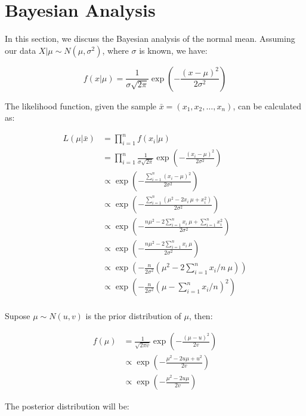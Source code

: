 \section{Bayesian Analysis}

In this section, we discuss the Bayesian analysis of the normal mean.
Assuming our data $X | \mu \sim N(\mu, \sigma^2)$, where $\sigma$ is known, we have:

\[ f(x | \mu) = \frac{1}{\sigma \sqrt{2\pi}} \exp\left(-\frac{(x - \mu)^2}{2\sigma^2}\right) \]

The likelihood function, given the sample $\bar{x} = (x_1, x_2, \dots, x_n)$, can be calculated as:

\begin{align*}
L(\mu | \bar{x}) &= \prod_{i = 1}^{n} f(x_i | \mu) \\
&= \prod_{i = 1}^{n} \frac{1}{\sigma \sqrt{2\pi}} \exp\left(-\frac{(x_i - \mu)^2}{2\sigma^2}\right) \\
&\propto \exp\left(-\frac{\sum_{i = 1}^{n} (x_i - \mu)^2}{2\sigma^2}\right) \\
&\propto \exp\left(-\frac{\sum_{i = 1}^{n} (\mu^2 - 2x_i ~ \mu + x_i^2)}{2\sigma^2}\right) \\
&\propto \exp\left(-\frac{n \mu^2 - 2\sum_{i = 1}^{n} x_i ~ \mu + \sum_{i = 1}^{n} x_i^2}{2\sigma^2}\right) \\
&\propto \exp\left(-\frac{n \mu^2 - 2\sum_{i = 1}^{n} x_i ~ \mu}{2\sigma^2}\right) \\
&\propto \exp\left(-\frac{n}{2\sigma^2} \left(\mu^2 - 2\sum_{i = 1}^{n} x_i / n ~ \mu\right)\right) \\
&\propto \exp\left(-\frac{n}{2\sigma^2} \left(\mu - \sum_{i = 1}^{n} x_i / n\right)^2\right) \\
\end{align*}

Supose $\mu \sim N(u, v)$ is the prior distribution of $\mu$, then:

\begin{align*}
f(\mu) &= \frac{1}{\sqrt{2\pi v}} \exp\left(-\frac{(\mu - u)^2}{2v}\right) \\
&\propto \exp\left(-\frac{\mu^2 - 2u \mu + u^2}{2v}\right) \\
&\propto \exp\left(-\frac{\mu^2 - 2u \mu}{2v}\right)
\end{align*}

The posterior distribution will be:

